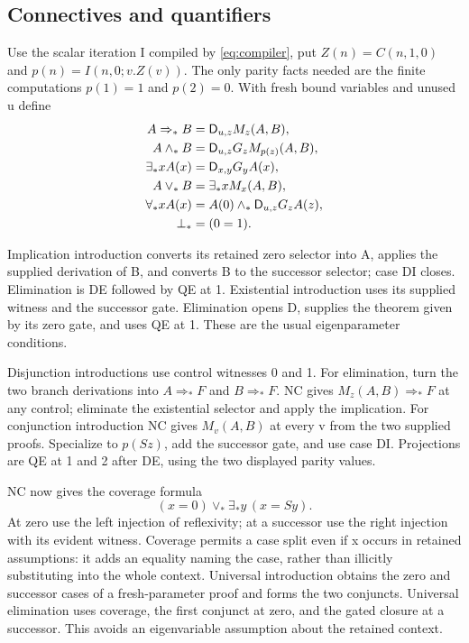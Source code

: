 \subsection{Connectives and quantifiers}

Use the scalar iteration I compiled by \eqref{eq:compiler}, put
$Z(n)=C(n,1,0)$ and $p(n)=I(n,0;v.Z(v))$. The only parity facts
needed are the finite computations $p(1)=1$ and $p(2)=0$.
With fresh bound variables and unused u define
\begin{align*}
 A\Rightarrow_*B&=\mathsf D_{u,z}M_z(A,B),\\
 A\wedge_*B&=\mathsf D_{u,z}G_zM_{p(z)}(A,B),\\
 \exists_*x A(x)&=\mathsf D_{x,y}G_yA(x),\\
 A\vee_*B&=\exists_*x M_x(A,B),\\
 \forall_*x A(x)&=A(0)\wedge_*\mathsf D_{u,z}G_zA(z),\\
 \bot_*&=(0=1).
\end{align*}

Implication introduction converts its retained zero selector into A,
applies the supplied derivation of B, and converts B to the successor
selector; case DI closes. Elimination is DE followed by QE at 1.
Existential introduction uses its supplied witness and the successor
gate. Elimination opens D, supplies the theorem given by its zero gate,
and uses QE at 1. These are the usual eigenparameter conditions.

Disjunction introductions use control witnesses 0 and 1. For elimination,
turn the two branch derivations into $A\Rightarrow_*F$ and
$B\Rightarrow_*F$. NC gives $M_z(A,B)\Rightarrow_*F$ at any control;
eliminate the existential selector and apply the implication.
For conjunction introduction NC gives $M_v(A,B)$ at every v from the
two supplied proofs. Specialize to $p(Sz)$, add the successor gate,
and use case DI. Projections are QE at 1 and 2 after DE, using the two
displayed parity values.

NC now gives the coverage formula
\[
             (x=0)\vee_*\exists_*y\,(x=Sy).
\]
At zero use the left injection of reflexivity; at a successor use the
right injection with its evident witness. Coverage permits a case split
even if x occurs in retained assumptions: it adds an equality naming
the case, rather than illicitly substituting into the whole context.
Universal introduction obtains the zero and successor cases of a
fresh-parameter proof and forms the two conjuncts. Universal elimination
uses coverage, the first conjunct at zero, and the gated closure at a
successor. This avoids an eigenvariable assumption about the retained context.

